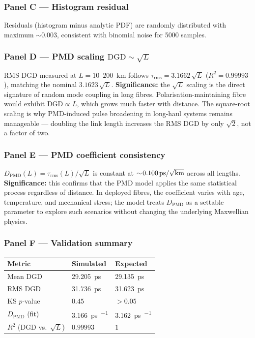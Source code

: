 ﻿\documentclass[11pt,a4paper]{article}
\begin{document}
\subsubsection*{Panel C --- Histogram residual}
Residuals (histogram minus analytic PDF) are randomly distributed with
maximum $\sim\!0.003$, consistent with binomial noise for 5000 samples.

\subsubsection*{Panel D --- PMD scaling $\text{DGD} \sim \sqrt{L}$}
RMS DGD measured at $L = 10$--$200$~\si{\km} follows
$\tau_\text{rms} = 3.1662\,\sqrt{L}$ ($R^2 = 0.99993$), matching the
nominal $3.1623\,\sqrt{L}$.  \textbf{Significance:} the $\sqrt{L}$ scaling
is the direct signature of random mode coupling in long fibres.
Polarisation-maintaining fibre would exhibit $\text{DGD} \propto L$, which
grows much faster with distance.  The square-root scaling is why
PMD-induced pulse broadening in long-haul systems remains manageable ---
doubling the link length increases the RMS DGD by only $\sqrt{2}$, not a
factor of two.

\subsubsection*{Panel E --- PMD coefficient consistency}
$D_\text{PMD}(L) = \tau_\text{rms}(L)/\sqrt{L}$ is constant at
$\sim\!\SI{0.100}{\ps\per\sqrt{\km}}$ across all lengths.
\textbf{Significance:} this confirms that the PMD model applies the same
statistical process regardless of distance.  In deployed fibres, the
coefficient varies with age, temperature, and mechanical stress; the model
treats $D_\text{PMD}$ as a settable parameter to explore such scenarios
without changing the underlying Maxwellian physics.

\subsubsection*{Panel F --- Validation summary}
\begin{tabular}{lll}
\toprule
Metric & Simulated & Expected \\
\midrule
Mean DGD & \SI{29.205}{\ps} & \SI{29.135}{\ps} \\
RMS DGD  & \SI{31.736}{\ps} & \SI{31.623}{\ps} \\
KS $p$-value & $0.45$ & $>0.05$ \\
$D_\text{PMD}$ (fit) & \SI{3.166}{\ps\per\sqrt{\km}} & \SI{3.162}{\ps\per\sqrt{\km}} \\
$R^2$ (DGD vs.\ $\sqrt{L}$) & $0.99993$ & $1$ \\
\bottomrule
\end{tabular}
\end{document}
